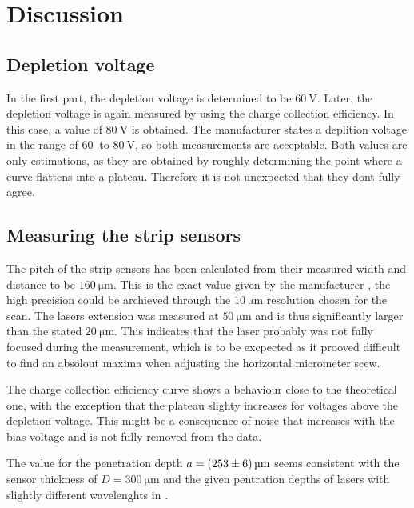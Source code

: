 \section{Discussion}
\label{sec:Discussion}

\subsection{Depletion voltage}

In the first part, the depletion voltage is determined to be $\qty{60}{\volt}$.
Later, the depletion voltage is again measured by using the charge collection efficiency.
In this case, a value of $\qty{80}{\volt}$ is obtained. The manufacturer \cite{V15} states a deplition
voltage in the range of $\qty{60}{}$ to $\qty{80}{\volt}$, so both measurements are
acceptable. Both values are only estimations, as they are obtained by roughly determining the
point where a curve flattens into a plateau. Therefore it is not unexpected that they dont fully agree.

\subsection{Measuring the strip sensors}

The pitch of the strip sensors has been calculated from their measured width and distance to be
$\qty{160}{\micro\meter}$. This is the exact value given by the manufacturer \cite{V15}, the high
precision could be archieved through the $\qty{10}{\micro\meter}$ resolution chosen for the scan.
The lasers extension was measured at $\qty{50}{\micro\meter}$ and is thus significantly larger
than the stated \cite{V15} $\qty{20}{\micro\meter}$. This indicates that the laser probably was not
fully focused during the measurement, which is to be excpected as it prooved difficult to find an
absolout maxima when adjusting the horizontal micrometer scew.

The charge collection efficiency curve shows a behaviour close to the theoretical one, with the
exception that the plateau slighty increases for voltages above the depletion voltage. This might be
a consequence of noise that increases with the bias voltage and is not fully removed from the data.

The value for the penetration depth $ a= \qty{253+-6}{\micro\meter}$ seems consistent with the sensor
thickness of $D = \qty{300}{\micro\meter}$ and the given pentration depths of lasers with slightly different
wavelenghts in \cite{V15}.

